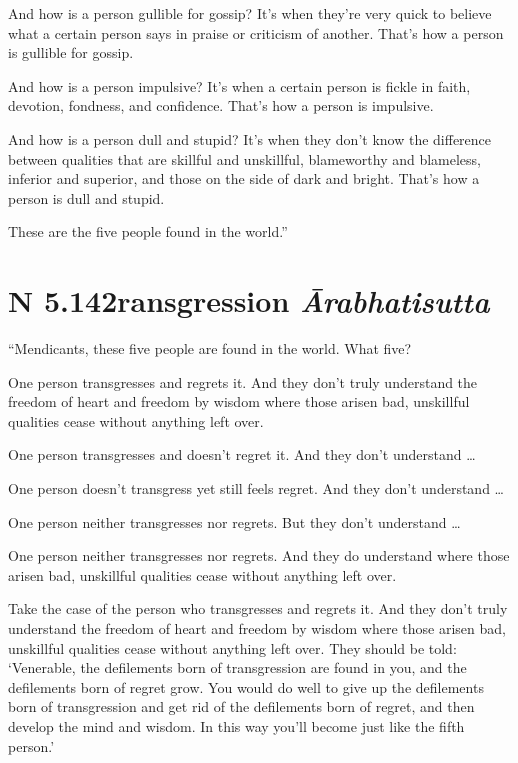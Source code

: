 \documentclass[12pt,openany]{book}%
\newcommand*{\suttatitleacronym}[1]{\smaller[2]{#1}\vspace*{.3em}}
\newcommand*{\suttatitletranslation}[1]{\linebreak{#1}}
\newcommand*{\suttatitleroot}[1]{\linebreak\smaller[2]\itshape{#1}}
\newcommand*{\tocacronym}[1]{\hspace*{-3.3em}{#1}\quad}
\newcommand*{\toctranslation}[1]{#1}
\newcommand*{\tocroot}[1]{(\textit{#1})}
\begin{document}
And how is a person gullible for gossip? It’s when they’re very quick to believe what a certain person says in praise or criticism of another. That’s how a person is gullible for gossip. 

And how is a person impulsive? It’s when a certain person is fickle in faith, devotion, fondness, and confidence. That’s how a person is impulsive. 

And how is a person dull and stupid? It’s when they don’t know the difference between qualities that are skillful and unskillful, blameworthy and blameless, inferior and superior, and those on the side of dark and bright. That’s how a person is dull and stupid. 

These are the five people found in the world.” 

%
\section*{{\suttatitleacronym AN 5.142}{\suttatitletranslation Transgression }{\suttatitleroot Ārabhatisutta}}
\addcontentsline{toc}{section}{\tocacronym{AN 5.142} \toctranslation{Transgression } \tocroot{Ārabhatisutta}}

“Mendicants, these five people are found in the world. What five? 

One person transgresses and regrets it. And they don’t truly understand the freedom of heart and freedom by wisdom where those arisen bad, unskillful qualities cease without anything left over. 

One person transgresses and doesn’t regret it. And they don’t understand … 

One person doesn’t transgress yet still feels regret. And they don’t understand … 

One person neither transgresses nor regrets. But they don’t understand … 

One person neither transgresses nor regrets. And they do understand where those arisen bad, unskillful qualities cease without anything left over. 

Take the case of the person who transgresses and regrets it. And they don’t truly understand the freedom of heart and freedom by wisdom where those arisen bad, unskillful qualities cease without anything left over. They should be told: ‘Venerable, the defilements born of transgression are found in you, and the defilements born of regret grow. You would do well to give up the defilements born of transgression and get rid of the defilements born of regret, and then develop the mind and wisdom. In this way you’ll become just like the fifth person.’ 
\end{document}
